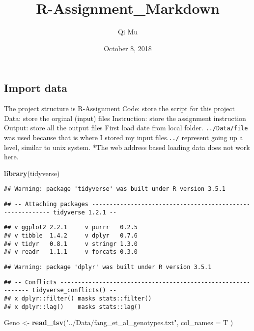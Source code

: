 \documentclass[]{article}
\title{R-Assignment\_Markdown}
\author{Qi Mu}
\date{October 8, 2018}
\newenvironment{Shaded}{\begin{snugshade}}{\end{snugshade}}
\newcommand{\KeywordTok}[1]{\textcolor[rgb]{0.13,0.29,0.53}{\textbf{#1}}}
\newcommand{\DataTypeTok}[1]{\textcolor[rgb]{0.13,0.29,0.53}{#1}}
\newcommand{\StringTok}[1]{\textcolor[rgb]{0.31,0.60,0.02}{#1}}
\newcommand{\NormalTok}[1]{#1}
\begin{document}
\maketitle

\subsection{Import data}\label{import-data}

The project structure is R-Assignment Code: store the script for this
project Data: store the orginal (input) files Instruction: store the
assignment instruction Output: store all the output files First load
date from local folder. \texttt{../Data/file} was used because that is
where I stored my input files.\texttt{../} represent going up a level,
similar to unix system. *The web address based loading data does not
work here.

\begin{Shaded}
\begin{Highlighting}[]
\KeywordTok{library}\NormalTok{(tidyverse)}
\end{Highlighting}
\end{Shaded}

\begin{verbatim}
## Warning: package 'tidyverse' was built under R version 3.5.1
\end{verbatim}

\begin{verbatim}
## -- Attaching packages ---------------------------------------------------------- tidyverse 1.2.1 --
\end{verbatim}

\begin{verbatim}
## v ggplot2 2.2.1     v purrr   0.2.5
## v tibble  1.4.2     v dplyr   0.7.6
## v tidyr   0.8.1     v stringr 1.3.0
## v readr   1.1.1     v forcats 0.3.0
\end{verbatim}

\begin{verbatim}
## Warning: package 'dplyr' was built under R version 3.5.1
\end{verbatim}

\begin{verbatim}
## -- Conflicts ------------------------------------------------------------- tidyverse_conflicts() --
## x dplyr::filter() masks stats::filter()
## x dplyr::lag()    masks stats::lag()
\end{verbatim}

\begin{Shaded}
\begin{Highlighting}[]
\NormalTok{Geno <-}\StringTok{ }\KeywordTok{read_tsv}\NormalTok{(}\StringTok{"../Data/fang_et_al_genotypes.txt"}\NormalTok{, }\DataTypeTok{col_names =}\NormalTok{ T )}
\end{Highlighting}
\end{Shaded}
\end{document}
